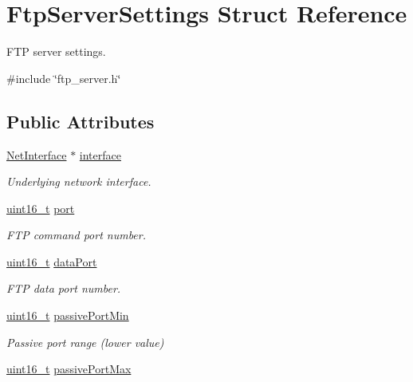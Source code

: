 \hypertarget{structFtpServerSettings}{}\section{Ftp\+Server\+Settings Struct Reference}
\label{structFtpServerSettings}


F\+TP server settings.  




{\ttfamily \#include \char`\"{}ftp\+\_\+server.\+h\char`\"{}}

\subsection*{Public Attributes}
\begin{DoxyCompactItemize}
\item 
\hyperlink{net_8h_a2234db8911a1148c9159979d8f5e0d6b}{Net\+Interface} $\ast$ \hyperlink{structFtpServerSettings_ad11e10bdc70d2e513c530f93a107e445}{interface}
\begin{DoxyCompactList}\small\item\em Underlying network interface. \end{DoxyCompactList}\item 
\hyperlink{stdint_8h_a273cf69d639a59973b6019625df33e30}{uint16\+\_\+t} \hyperlink{structFtpServerSettings_a147e45ee6c047a4fdd0cd5b8f86b9dee}{port}
\begin{DoxyCompactList}\small\item\em F\+TP command port number. \end{DoxyCompactList}\item 
\hyperlink{stdint_8h_a273cf69d639a59973b6019625df33e30}{uint16\+\_\+t} \hyperlink{structFtpServerSettings_ab762670572bc8baa139a71e62cf3fa0f}{data\+Port}
\begin{DoxyCompactList}\small\item\em F\+TP data port number. \end{DoxyCompactList}\item 
\hyperlink{stdint_8h_a273cf69d639a59973b6019625df33e30}{uint16\+\_\+t} \hyperlink{structFtpServerSettings_a73f929e99c294e6d04bf3a3306676aa1}{passive\+Port\+Min}
\begin{DoxyCompactList}\small\item\em Passive port range (lower value) \end{DoxyCompactList}\item 
\hyperlink{stdint_8h_a273cf69d639a59973b6019625df33e30}{uint16\+\_\+t} \hyperlink{structFtpServerSettings_a482982b26fa039c6df31e22e61cbdc72}{passive\+Port\+Max}

\end{DoxyCompactItemize}
